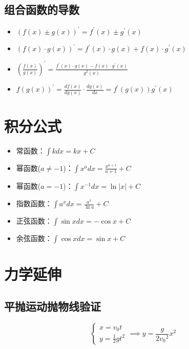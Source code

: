 \subsection{组合函数的导数}

\begin{itemize}
    \item $(f(x)\pm g(x))^\prime=f^\prime(x)\pm g^\prime(x)$
    \item $(f(x)\cdot g(x))^\prime=f^\prime(x)\cdot g(x)+f(x)\cdot g^\prime(x)$
    \item $(\frac{f(x)}{g(x)})^\prime=\frac{f^\prime(x)\cdot g(x)-f(x)\cdot g^\prime(x)}{g^2(x)}$
    \item $f(g(x))^\prime=\frac{df(x)}{dg(x)}\cdot\frac{dg(x)}{dx}=f^\prime(g(x))g^\prime(x)$
\end{itemize}

\section{积分公式}

\begin{itemize}
    \item 常函数：$\int kdx=kx+C$
    \item 幂函数($a\neq-1$)：$\int x^adx=\frac{x^{a+1}}{a+1}+C$
    \item 幂函数($a=-1$)：$\int x^{-1}dx=\ln|x|+C$
    \item 指数函数：$\int a^xdx=\frac{a^x}{\ln a}+C$
    \item 正弦函数：$\int\sin xdx=-\cos x+C$
    \item 余弦函数：$\int\cos xdx=\sin x+C$
\end{itemize}

\section{力学延伸}

\subsection{平抛运动抛物线验证}

\begin{equation*}
    \begin{cases}
        x=v_0t\\
        y=\frac12gt^2
    \end{cases}\implies
    y=\frac{g}{2{v_0}^2}x^2
\end{equation*}

